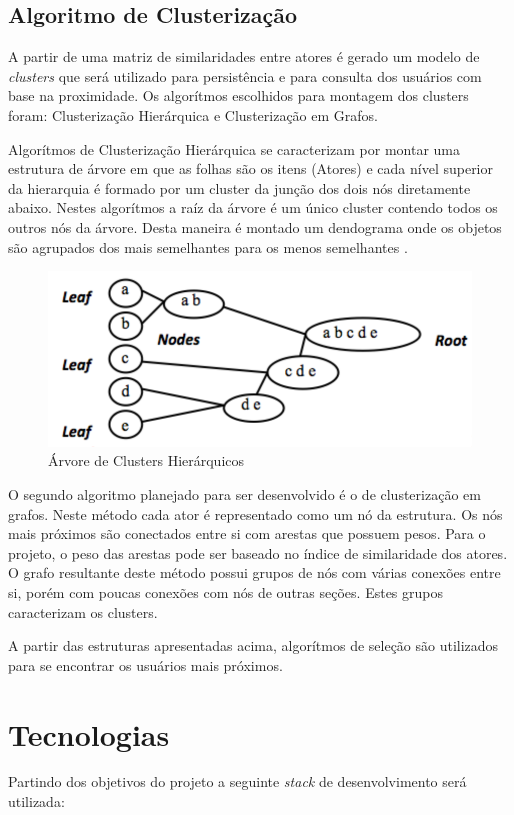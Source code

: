 \documentclass[
	12pt,				%
    oneside,			%
	a4paper,			%
	english,			%
	french,				%
	spanish,			%
	brazil,				%
	]{abntex2}
\begin{document}
\subsection{Algoritmo de Clusterização}
A partir de uma matriz de similaridades entre atores é gerado um modelo de \textit{clusters} que será utilizado para persistência e para consulta dos usuários com base na proximidade. Os algorítmos escolhidos para montagem dos clusters foram: 
Clusterização Hierárquica e Clusterização em Grafos. 

Algorítmos de Clusterização Hierárquica se caracterizam por montar uma estrutura de árvore em que as folhas são os itens (Atores) e cada nível superior da hierarquia é formado por um cluster da junção dos dois nós diretamente abaixo. Nestes algorítmos a raíz da árvore é um
único cluster contendo todos os outros nós da árvore. Desta maneira é montado um dendograma onde os objetos são agrupados dos mais semelhantes para os menos semelhantes \cite{10-HierarchicalClusteringAnalysis}.

\begin{figure}[hbt]
	\label{Árvore de Clusters Hierárquicos}
	\caption{Árvore de Clusters Hierárquicos}
	\includegraphics{hierarquical-clustering-01.png}
\end{figure}

O segundo algoritmo planejado para ser desenvolvido é o de clusterização em grafos. Neste método cada ator é representado como um nó da estrutura. Os nós mais próximos são conectados entre si com arestas que possuem pesos. Para o projeto, o peso das
arestas pode ser baseado no índice de similaridade dos atores. O grafo resultante deste método possui grupos de nós com várias conexões entre si, porém com poucas conexões com nós de outras seções. Estes grupos caracterizam os clusters.

A partir das estruturas apresentadas acima, algorítmos de seleção são utilizados para se encontrar os usuários mais próximos.

\section{Tecnologias}
Partindo dos objetivos do projeto a seguinte \textit{stack} de desenvolvimento será utilizada:
\end{document}
